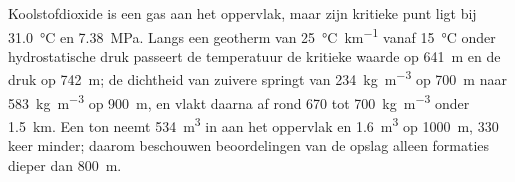 Koolstofdioxide is een gas aan het oppervlak, maar zijn kritieke punt ligt bij \qty{31.0}{\celsius} en
\qty{7.38}{MPa}. Langs een geotherm van \qty{25}{\celsius\per\km} vanaf \qty{15}{\celsius} onder
hydrostatische druk passeert de temperatuur de kritieke waarde op \qty{641}{m} en de druk op
\qty{742}{m}; de dichtheid van zuivere  springt van \qty{234}{kg.m^{-3}} op \qty{700}{m} naar
\qty{583}{kg.m^{-3}} op \qty{900}{m}, en vlakt daarna af rond 670 tot \qty{700}{kg.m^{-3}} onder
\qty{1.5}{km}. Een ton neemt \qty{534}{m^3} in aan het oppervlak en \qty{1.6}{m^3} op \qty{1000}{m},
330 keer minder; daarom beschouwen beoordelingen van de opslag alleen formaties dieper dan
\qty{800}{m}.

